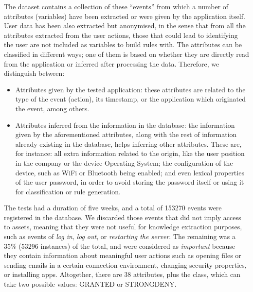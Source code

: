 \documentclass[runningheads]{llncs}
\begin{document}
The dataset contains a collection of these ``events'' from which a number of attributes (variables) have been extracted or were given by the application itself. User data has been also extracted but anonymised, in the sense that from all the attributes extracted from the user actions, those that could lead to identifying the user are not included as variables to build rules with. The attributes can be classified in different ways; one of them is based on whether they are directly read from the application or inferred after processing the data. Therefore, we distinguish between:
\begin{itemize}
  \item Attributes given by the tested application: these attributes
    are related to the type of the event (action), its timestamp, or
    the application which originated the event, among others. 
  \item Attributes inferred from the information in the database: the information given by the aforementioned attributes, along with the rest of information already existing in the database, helps inferring other attributes. These are, for instance: all extra information related to the origin, like the user position in the company or the device Operating System; the configuration of the device, such as WiFi or Bluetooth being enabled; and even lexical properties of the user password, in order to avoid storing the password itself or using it for classification or rule generation.
\end{itemize}

The tests had a duration of five weeks, and a total of 
153270 events were registered in the database. We discarded those events that did not imply access to assets, meaning that they were not useful for
knowledge extraction purposes, such as events of \textit{log in},
\textit{log out}, or \textit{restarting the server}.
The remaining was a 35\% (53296 instances) of the total, and were considered as \textit{important}
because they contain information about meaningful user actions such as
opening files or sending emails in a certain connection environment,
changing security properties, or installing apps. Altogether, there
are 38 attributes, plus the class, which can take two possible values:
GRANTED or STRONGDENY. 

\end{document}
